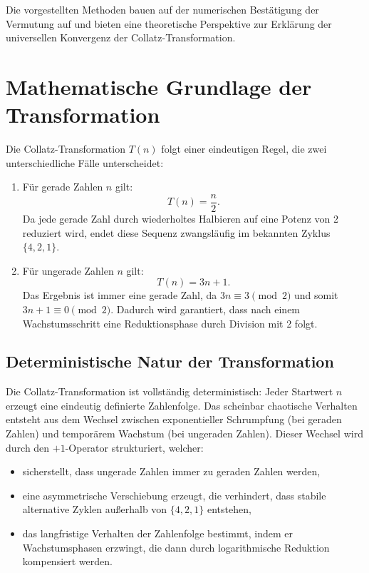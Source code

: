 \documentclass[a4paper,12pt]{article}
\begin{document}
Die vorgestellten Methoden bauen auf der numerischen Bestätigung der Vermutung auf und bieten eine theoretische Perspektive zur Erklärung der universellen Konvergenz der Collatz-Transformation.


\section{Mathematische Grundlage der Transformation}
Die Collatz-Transformation \( T(n) \) folgt einer eindeutigen Regel, die zwei unterschiedliche Fälle unterscheidet:
\begin{enumerate}
    \item Für gerade Zahlen \( n \) gilt:
    \[
    T(n) = \frac{n}{2}.
    \]
    Da jede gerade Zahl durch wiederholtes Halbieren auf eine Potenz von 2 reduziert wird, endet diese Sequenz zwangsläufig im bekannten Zyklus \( \{4, 2, 1\} \).
    
    \item Für ungerade Zahlen \( n \) gilt:
    \[
    T(n) = 3n + 1.
    \]
    Das Ergebnis ist immer eine gerade Zahl, da \( 3n \equiv 3 \pmod{2} \) und somit \( 3n + 1 \equiv 0 \pmod{2} \). Dadurch wird garantiert, dass nach einem Wachstumsschritt eine Reduktionsphase durch Division mit 2 folgt.
\end{enumerate}

\subsection{Deterministische Natur der Transformation}
Die Collatz-Transformation ist vollständig deterministisch: Jeder Startwert \( n \) erzeugt eine eindeutig definierte Zahlenfolge. Das scheinbar chaotische Verhalten entsteht aus dem Wechsel zwischen exponentieller Schrumpfung (bei geraden Zahlen) und temporärem Wachstum (bei ungeraden Zahlen). Dieser Wechsel wird durch den \(+1\)-Operator strukturiert, welcher:

\begin{itemize}
    \item sicherstellt, dass ungerade Zahlen immer zu geraden Zahlen werden,
    \item eine asymmetrische Verschiebung erzeugt, die verhindert, dass stabile alternative Zyklen außerhalb von \( \{4, 2, 1\} \) entstehen,
    \item das langfristige Verhalten der Zahlenfolge bestimmt, indem er Wachstumsphasen erzwingt, die dann durch logarithmische Reduktion kompensiert werden.
\end{itemize}
\end{document}

